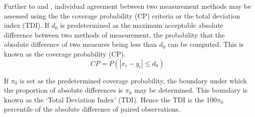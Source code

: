 \documentclass[12pt, a4paper]{report}
\theoremstyle{plain}
\theoremstyle{definition}
\theoremstyle{remark}
\begin{document}
Further to  \citet{lin2000} and \citet{lin2002}, individual agreement between two measurement methods may be
assessed using the the coverage probability (CP) criteria or the total deviation index (TDI). If $d_{0}$ is predetermined as the maximum acceptable absolute difference between two methods of measurement, the probability that the absolute difference of two measures being less than $d_{0}$ can be computed. This is known as the coverage probability (CP).
\begin{equation}
CP = P(|x_{i} - y_{i}| \leq d_{0})
\end{equation}

If $\pi_{0}$ is set as the predetermined coverage probability, the
boundary under which the proportion of absolute differences is
$\pi_{0}$ may be determined. This boundary is known as the `Total Deviation Index' (TDI). Hence the TDI is the $100\pi_{0}$
percentile of the absolute difference of paired observations.



	


	
	
\end{document}
